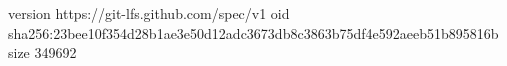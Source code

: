 version https://git-lfs.github.com/spec/v1
oid sha256:23bee10f354d28b1ae3e50d12adc3673db8c3863b75df4e592aeeb51b895816b
size 349692
